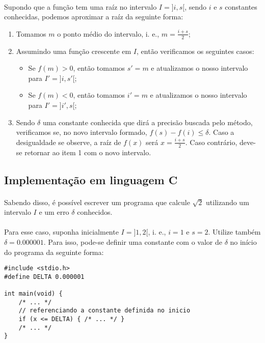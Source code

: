 \documentclass{article}
\begin{document}
            \paragraph{}
            Supondo que a função tem uma raíz no intervalo $I = ]i, s[$, sendo
            $i$ e $s$ constantes conhecidas, podemos aproximar a raíz da seguinte forma:

            \begin{enumerate}
                \item Tomamos $m$ o ponto médio do intervalo, i. e., $m = \frac{i + s} {2}$;
                \item Assumindo uma função crescente em $I$, então verificamos os seguintes casos:
                \begin{itemize}
                    \item Se $f(m) > 0$, então tomamos $s' = m$ e atualizamos o nosso intervalo para
                    $I' = ]i, s'[$;

                    \item Se $f(m) < 0$, então tomamos $i' = m$ e atualizamos o nosso intervalo para
                    $I' = ]i', s[$;
                \end{itemize}
                \item Sendo $\delta$ uma constante conhecida que dirá a precisão buscada pelo método,
                verificamos se, no novo intervalo formado, $f(s) - f(i) \leq \delta$. Caso a desigualdade se
                observe, a raíz de $f(x)$ será $x = \frac{i + s} {2}$. Caso contrário, deve-se retornar ao item 1 com
                o novo intervalo.
            \end{enumerate}

        \subsection{Implementação em linguagem C}
            \paragraph{}
            Sabendo disso, é possível escrever um programa que calcule $\sqrt{2}$ utilizando um intervalo $I$ e um
            erro $\delta$ conhecidos.

            \paragraph{}
            Para esse caso, suponha inicialmente $I = ]1, 2[$, i. e., $i = 1$ e $s = 2$. Utilize também $\delta = 0.000001$.
            Para isso, pode-se definir uma constante com o valor de $\delta$ no início do programa da seguinte forma:
            \begin{lstlisting}
#include <stdio.h>
#define DELTA 0.000001

int main(void) {
    /* ... */
    // referenciando a constante definida no inicio
    if (x <= DELTA) { /* ... */ }
    /* ... */
}
            \end{lstlisting}
\end{document}
